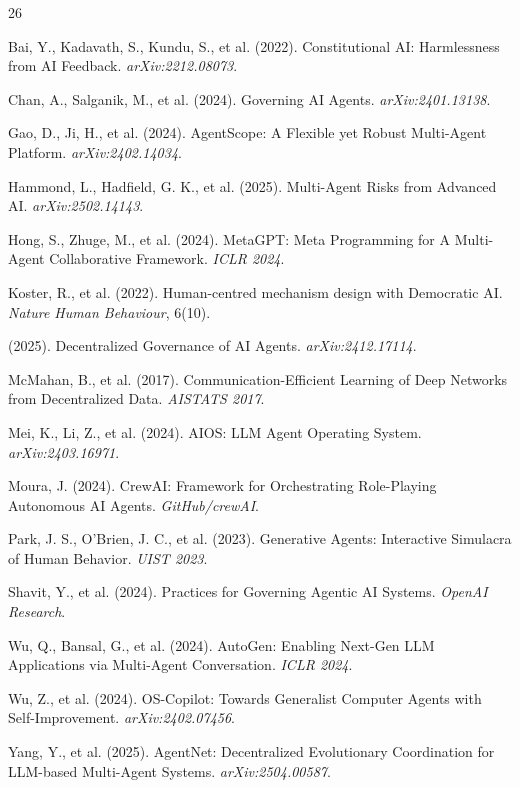 \documentclass[12pt,a4paper]{article}
\begin{document}
\begin{thebibliography}{26}

 Bai, Y., Kadavath, S., Kundu, S., et al. (2022). Constitutional AI: Harmlessness from AI Feedback. \textit{arXiv:2212.08073}.

 Chan, A., Salganik, M., et al. (2024). Governing AI Agents. \textit{arXiv:2401.13138}.

 Gao, D., Ji, H., et al. (2024). AgentScope: A Flexible yet Robust Multi-Agent Platform. \textit{arXiv:2402.14034}.

 Hammond, L., Hadfield, G. K., et al. (2025). Multi-Agent Risks from Advanced AI. \textit{arXiv:2502.14143}.

 Hong, S., Zhuge, M., et al. (2024). MetaGPT: Meta Programming for A Multi-Agent Collaborative Framework. \textit{ICLR 2024}.

 Koster, R., et al. (2022). Human-centred mechanism design with Democratic AI. \textit{Nature Human Behaviour}, 6(10).

 (2025). Decentralized Governance of AI Agents. \textit{arXiv:2412.17114}.

 McMahan, B., et al. (2017). Communication-Efficient Learning of Deep Networks from Decentralized Data. \textit{AISTATS 2017}.

 Mei, K., Li, Z., et al. (2024). AIOS: LLM Agent Operating System. \textit{arXiv:2403.16971}.

 Moura, J. (2024). CrewAI: Framework for Orchestrating Role-Playing Autonomous AI Agents. \textit{GitHub/crewAI}.

 Park, J. S., O'Brien, J. C., et al. (2023). Generative Agents: Interactive Simulacra of Human Behavior. \textit{UIST 2023}.

 Shavit, Y., et al. (2024). Practices for Governing Agentic AI Systems. \textit{OpenAI Research}.

 Wu, Q., Bansal, G., et al. (2024). AutoGen: Enabling Next-Gen LLM Applications via Multi-Agent Conversation. \textit{ICLR 2024}.

 Wu, Z., et al. (2024). OS-Copilot: Towards Generalist Computer Agents with Self-Improvement. \textit{arXiv:2402.07456}.

 Yang, Y., et al. (2025). AgentNet: Decentralized Evolutionary Coordination for LLM-based Multi-Agent Systems. \textit{arXiv:2504.00587}.


\end{thebibliography}
\end{document}
